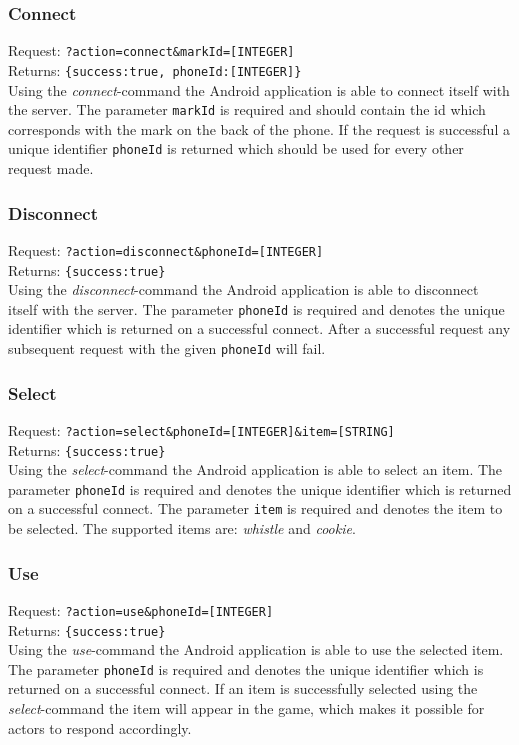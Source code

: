 \documentclass[a4paper,10pt]{article}
\begin{document}
	\subsubsection{Connect}
	Request: \texttt{?action=connect\&markId=[INTEGER]} \\
	Returns: \texttt{\{success:true, phoneId:[INTEGER]\}} \\

	\noindent Using the \emph{connect}-command the Android application is able to connect itself with the server.
	The parameter \texttt{markId} is required and should contain the id which corresponds with the mark on the back of the phone.
	If the request is successful a unique identifier \texttt{phoneId} is returned which should be used for every other request made.

	\subsubsection{Disconnect}
	Request: \texttt{?action=disconnect\&phoneId=[INTEGER]} \\
	Returns: \texttt{\{success:true\}} \\

	\noindent Using the \emph{disconnect}-command the Android application is able to disconnect itself with the server.
	The parameter \texttt{phoneId} is required and denotes the unique identifier which is returned on a successful connect.
	After a successful request any subsequent request with the given \texttt{phoneId} will fail.

	\subsubsection{Select}
	Request: \texttt{?action=select\&phoneId=[INTEGER]\&item=[STRING]} \\
	Returns: \texttt{\{success:true\}} \\

	\noindent Using the \emph{select}-command the Android application is able to select an item.
	The parameter \texttt{phoneId} is required and denotes the unique identifier which is returned on a successful connect.
	The parameter \texttt{item} is required and denotes the item to be selected. The supported items are: \emph{whistle} and \emph{cookie}.

	\subsubsection{Use}
	Request: \texttt{?action=use\&phoneId=[INTEGER]} \\
	Returns: \texttt{\{success:true\}} \\

	\noindent Using the \emph{use}-command the Android application is able to use the selected item.
	The parameter \texttt{phoneId} is required and denotes the unique identifier which is returned on a successful connect.
	If an item is successfully selected using the \emph{select}-command the item will appear in the game, which makes it possible for actors to respond accordingly.



\end{document}
